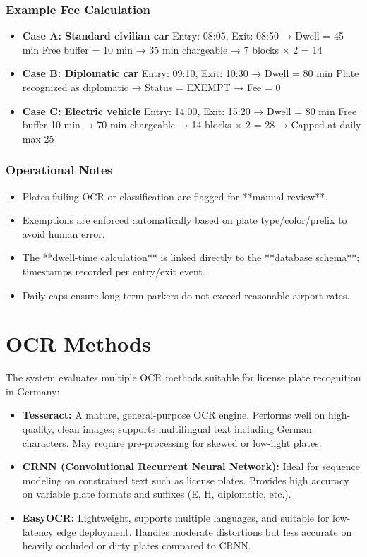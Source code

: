 	\subsubsection{Example Fee Calculation}
	\begin{itemize}
		\item \textbf{Case A: Standard civilian car}  
		Entry: 08:05, Exit: 08:50 → Dwell = 45 min  
		Free buffer = 10 min → 35 min chargeable → 7 blocks × \texteuro{}2 = \texteuro{}14
		
		\item \textbf{Case B: Diplomatic car}  
		Entry: 09:10, Exit: 10:30 → Dwell = 80 min  
		Plate recognized as diplomatic → Status = EXEMPT → Fee = \texteuro{}0
		
		\item \textbf{Case C: Electric vehicle}  
		Entry: 14:00, Exit: 15:20 → Dwell = 80 min  
		Free buffer 10 min → 70 min chargeable → 14 blocks × \texteuro{}2 = \texteuro{}28 → Capped at daily max \texteuro{}25
	\end{itemize}
	
	\subsubsection{Operational Notes}
	\begin{itemize}
		\item Plates failing OCR or classification are flagged for **manual review**.
		\item Exemptions are enforced automatically based on plate type/color/prefix to avoid human error.
		\item The **dwell-time calculation** is linked directly to the **database schema**; timestamps recorded per entry/exit event.
		\item Daily caps ensure long-term parkers do not exceed reasonable airport rates.
	\end{itemize}
	
	
	\section{OCR Methods}
	The system evaluates multiple OCR methods suitable for license plate recognition in Germany:
	
	\begin{itemize}
		\item \textbf{Tesseract:} A mature, general-purpose OCR engine. Performs well on high-quality, clean images; supports multilingual text including German characters. May require pre-processing for skewed or low-light plates.
		\item \textbf{CRNN (Convolutional Recurrent Neural Network):} Ideal for sequence modeling on constrained text such as license plates. Provides high accuracy on variable plate formats and suffixes (E, H, diplomatic, etc.).
		\item \textbf{EasyOCR:} Lightweight, supports multiple languages, and suitable for low-latency edge deployment. Handles moderate distortions but less accurate on heavily occluded or dirty plates compared to CRNN.
	\end{itemize}
	
